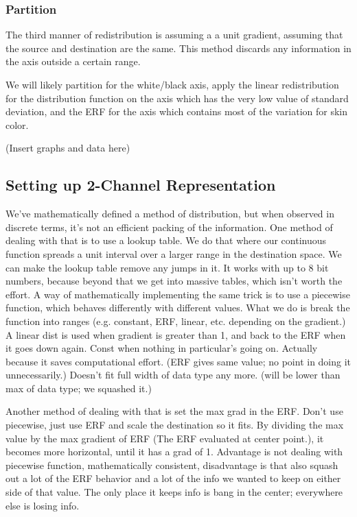 \documentclass[10pt,a4paper]{article}
\begin{document}
\subsubsection{Partition}\label{sec:Partition}
The third manner of redistribution is assuming a a unit gradient, assuming that the source and destination are the same. This method discards any information in the axis outside a certain range.

We will likely partition for the white/black axis, apply the linear redistribution for the distribution function on the axis which has the very low value of standard deviation, and the ERF for the axis which contains most of the variation for skin color.

(Insert graphs and data here)

\subsection{Setting up 2-Channel Representation}\label{sec:SettingUp2-ChannelRepresentation}
We've mathematically defined a method of distribution, but when observed in discrete terms, it's not an efficient packing of the information. One method of dealing with that is to use a lookup table. We do that where our continuous function spreads a unit interval over a larger range in the destination space. We can make the lookup table remove any jumps in it. It works with up to 8 bit numbers, because beyond that we get into massive tables, which isn't worth the effort. A way of mathematically implementing the same trick is to use a piecewise function, which behaves differently with different values. What we do is break the function into ranges (e.g. constant, ERF, linear, etc. depending on the gradient.) A linear dist is used when gradient is greater than 1, and back to the ERF when it goes down again. Const when nothing in particular's going on. Actually because it saves computational effort. (ERF gives same value; no point in doing it unnecessarily.) Doesn't fit full width of data type any more. (will be lower than max of data type; we squashed it.)

Another method of dealing with that is set the max grad in the ERF. Don't use piecewise, just use ERF and scale the destination so it fits. By dividing the max value by the max gradient of ERF (The ERF evaluated at center point.), it becomes more horizontal, until it has a grad of 1. Advantage is not dealing with piecewise function, mathematically consistent, disadvantage is that also squash out a lot of the ERF behavior and a lot of the info we wanted to keep on either side of that value. The only place it keeps info is bang in the center; everywhere else is losing info.
\end{document}
